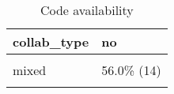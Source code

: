 \documentclass[
]{article}
\begin{document}
\begin{table}[H]

\caption{\label{tab:unnamed-chunk-61}Code availability}
\centering
\begin{tabular}[t]{ll}
\toprule
collab\_type & no\\
\midrule
\cellcolor{gray!6}{purely\_academic} & \cellcolor{gray!6}{44.0\% (11)}\\
mixed & 56.0\% (14)\\
\cellcolor{gray!6}{Total} & \cellcolor{gray!6}{100.0\% (25)}\\
\bottomrule
\end{tabular}
\end{table}
\end{document}
